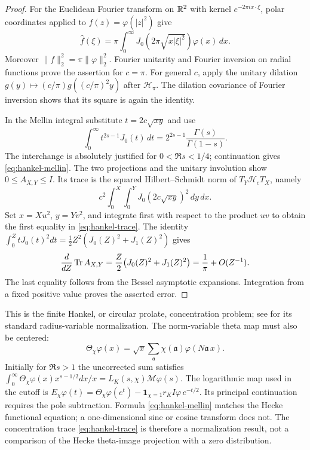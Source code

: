\begin{proof}
For the Euclidean Fourier transform on $\mathbb R^2$ with kernel
$e^{-2\pi i x\cdot\xi}$, polar coordinates applied to
$f(z)=\varphi(|z|^2)$ give
\[
 \widehat f(\xi)
   =\pi\int_0^\infty J_0(2\pi\sqrt{x|\xi|^2})\varphi(x)\,dx.
\]
Moreover $\|f\|_2^2=\pi\|\varphi\|_2^2$. Fourier unitarity and
Fourier inversion on radial functions prove the assertion for $c=\pi$.
For general $c$, apply the unitary dilation
$g(y)\mapsto(c/\pi)g((c/\pi)^2y)$ after $\mathcal H_\pi$.
The dilation covariance of Fourier inversion shows that its square
is again the identity.

In the Mellin integral substitute $t=2c\sqrt{xy}$ and use
\[
 \int_0^\infty t^{2s-1}J_0(t)\,dt
       =2^{2s-1}\frac{\Gamma(s)}{\Gamma(1-s)}.
\]
The interchange is absolutely justified for $0<\Re s<1/4$; continuation
gives \eqref{eq:hankel-mellin}. The two projections and the unitary
involution show $0\leq A_{X,Y}\leq I$. Its trace is the squared
Hilbert--Schmidt norm of $T_Y\mathcal H_cT_X$, namely
\[
 c^2\int_0^X\int_0^Y J_0(2c\sqrt{xy})^2\,dy\,dx.
\]
Set $x=Xu^2$, $y=Yv^2$, and integrate first with respect to the
product $uv$ to obtain the first equality in \eqref{eq:hankel-trace}.
The identity
$\int_0^ZtJ_0(t)^2dt=\tfrac12Z^2(J_0(Z)^2+J_1(Z)^2)$ gives
\[
 \frac d{dZ}\operatorname{Tr} A_{X,Y}
       =\frac Z2\bigl(J_0(Z)^2+J_1(Z)^2\bigr)
       =\frac1\pi+O(Z^{-1}).
\]
The last equality follows from the Bessel asymptotic expansions.
Integration from a fixed positive value proves the asserted error.
\end{proof}

This is the finite Hankel, or circular prolate, concentration problem;
see \citet[Section~1]{boulsane2017} for its standard radius-variable
normalization. The norm-variable theta map must also be centered:
\[
\Theta_\chi\varphi(x)=\sqrt{x}
       \sum_{\mathfrak a}\chi(\mathfrak a)\varphi(N\mathfrak a\,x).
\]
Initially for $\Re s>1$ the uncorrected sum satisfies
$\int_0^\infty\Theta_\chi\varphi(x)x^{s-1/2}dx/x
=L_K(s,\chi)\mathcal M\varphi(s)$.
The logarithmic map used in the cutoff is
$E_\chi\varphi(t)=\Theta_\chi\varphi(e^t)
-\mathbf1_{\chi=1}r_KI\varphi\,e^{-t/2}$.
Its principal continuation requires the pole subtraction. Formula
\eqref{eq:hankel-mellin} matches the Hecke functional equation; a
one-dimensional sine or cosine transform does not. The concentration
trace \eqref{eq:hankel-trace} is therefore a normalization result,
not a comparison of the Hecke theta-image projection with a zero
distribution.

